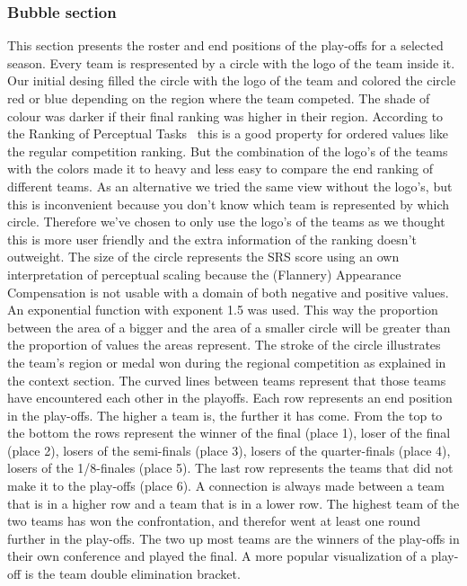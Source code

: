 \documentclass{sigchi}
\begin{document}
\subsubsection{Bubble section}
This section presents the roster and end positions of the play-offs for a selected season. Every team is respresented by a circle with the logo of the team inside it. Our initial desing filled the circle with the logo of the team and colored the circle red or blue depending on the region where the team competed. The shade of colour was darker if their final ranking was higher in their region. According to the Ranking of Perceptual Tasks~\cite{perceptualranking} this is a good property for ordered values like the regular competition ranking. But the combination of the logo's of the teams with the colors made it to heavy and less easy to compare the end ranking of different teams. As an alternative we tried the same view without the logo's, but this is inconvenient because you don't know which team is represented by which circle. Therefore we've chosen to only use the logo's of the teams as we thought this is more user friendly and the extra information of the ranking doesn't outweight. The size of the circle represents the SRS score using an own interpretation of perceptual scaling because the (Flannery) Appearance Compensation is not usable with a domain of both negative and positive values. An exponential function with exponent 1.5 was used. This way the proportion between the area of a bigger and the area of a smaller circle will be greater than the proportion of values the areas represent. The stroke of the circle illustrates the team's region or medal won during the regional competition as explained in the context section. The curved lines between teams represent that those teams have encountered each other in the playoffs. Each row represents an end position in the play-offs. The higher a team is, the further it has come. From the top to the bottom the rows represent the winner of the final (place 1), loser of the final (place 2), losers of the semi-finals (place 3), losers of the quarter-finals (place 4), losers of the 1/8-finales (place 5). The last row represents the teams that did not make it to the play-offs (place 6).  A connection is always made between a team that is in a higher row and a team that is in a lower row. The highest team of the two teams has won the confrontation, and therefor went at least one round further in the play-offs. The two up most teams are the winners of the play-offs in their own conference and played the final. 
A more popular visualization of a play-off is the team double elimination bracket.
\end{document}
